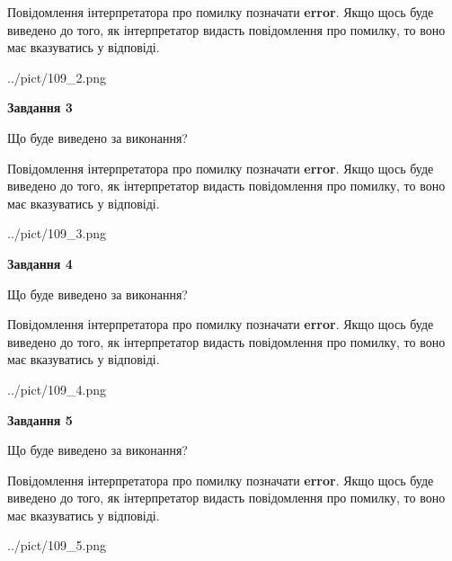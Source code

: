 \documentclass[12pt, ukrainian]{article}
\begin{document}
{\begin {large}
Повідомлення інтерпретатора про помилку позначати \textbf{error}.
Якщо щось буде виведено до того, як інтерпретатор видасть повідомлення про помилку, 
то воно має вказуватись у відповіді. \par


\begin{center}
	{../pict/109_2.png}
\end{center}
\newpage

{\begin {center}\textbf{Завдання 3}\end {center}}\par
Що буде виведено за виконання?

Повідомлення інтерпретатора про помилку позначати \textbf{error}.
Якщо щось буде виведено до того, як інтерпретатор видасть повідомлення про помилку, 
то воно має вказуватись у відповіді. \par


\begin{center}
	{../pict/109_3.png}
\end{center}
\newpage

{\begin {center}\textbf{Завдання 4}\end {center}}\par
Що буде виведено за виконання?

Повідомлення інтерпретатора про помилку позначати \textbf{error}.
Якщо щось буде виведено до того, як інтерпретатор видасть повідомлення про помилку, 
то воно має вказуватись у відповіді. \par


\begin{center}
	{../pict/109_4.png}
\end{center}
\newpage

{\begin {center}\textbf{Завдання 5}\end {center}}\par
Що буде виведено за виконання?

Повідомлення інтерпретатора про помилку позначати \textbf{error}.
Якщо щось буде виведено до того, як інтерпретатор видасть повідомлення про помилку, 
то воно має вказуватись у відповіді. \par


\begin{center}
	{../pict/109_5.png}
\end{center}
\newpage


\end{large}}
\end{document}
